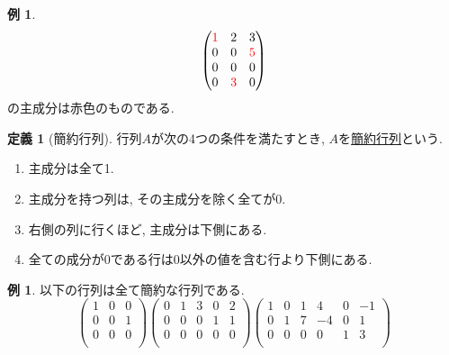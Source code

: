 \documentclass[dvipdfmx,a4paper,11pt]{article}
\theoremstyle{definition}
\newtheorem{dfn}[thm]{定義}
\newtheorem{exa}[thm]{例}
\newcommand{\xr}[1]{\textcolor{red}{#1}}
\begin{document}
 \begin{exa}
 $$
  \begin{pmatrix}
\xr{1} & 2&3\\
0 & 0&\xr{5}\\
0 & 0&0\\
0 & \xr{3}&0\\ 
 \end{pmatrix}
 $$
 の主成分は赤色のものである. 
 \end{exa}

 
\begin{tcolorbox}[
    colback = white,
    colframe = green!35!black,
    fonttitle = \bfseries,
    breakable = true]
    \begin{dfn}[簡約行列]
  行列$A$が次の4つの条件を満たすとき, $A$を\underline{簡約行列}という.
  \begin{enumerate}
  	\setlength{\parskip}{0cm}
  	\setlength{\itemsep}{0pt} 
\item 主成分は全て1.
\item 主成分を持つ列は, その主成分を除く全てが0.
\item 右側の列に行くほど, 主成分は下側にある.
\item 全ての成分が0である行は0以外の値を含む行より下側にある. 
  \end{enumerate}
  \end{dfn}
 \end{tcolorbox}
 \begin{exa}
以下の行列は全て簡約な行列である.
$$
\begin{pmatrix}
 1& 0& 0 \\
 0& 0& 1 \\
 0& 0& 0 \\
 \end{pmatrix}
 \begin{pmatrix}
 0& 1& 3  & 0&2\\
 0& 0& 0  & 1&1\\
 0& 0& 0 & 0&0\\
 \end{pmatrix}
  \begin{pmatrix}
 1& 0& 1  & 4&0&-1\\
 0& 1& 7 & -4&0&1\\
 0& 0& 0 & 0&1&3\\
 \end{pmatrix}
$$
\end{exa}
\end{document}
